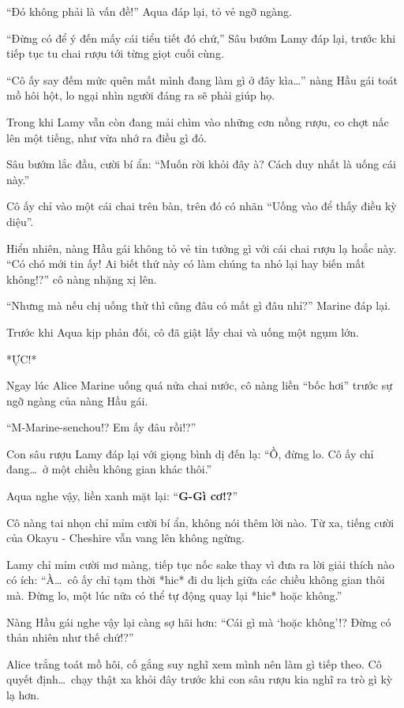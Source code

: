 \documentclass[../main.tex]{subfiles}
\begin{document}
``Đó không phải là vấn đề!'' Aqua đáp lại, tỏ vẻ ngỡ ngàng.

``Đừng có để ý đến mấy cái tiểu tiết đó chứ,'' Sâu bướm Lamy đáp lại, trước khi tiếp tục tu chai rượu tới từng giọt cuối cùng.

``Cô ấy say đếm mức quên mất mình đang làm gì ở đây kìa\dots'' nàng Hầu gái toát mồ hôi hột, lo ngại nhìn người đáng ra sẽ phải giúp họ.

Trong khi Lamy vẫn còn đang mải chìm vào những cơn nồng rượu, co chợt nấc lên một tiếng, như vừa nhớ ra điều gì đó.

Sâu bướm  lắc đầu, cười bí ẩn: ``Muốn rời khỏi đây à? Cách duy nhất là uống cái này.''

Cô ấy chỉ vào một cái chai trên bàn, trên đó có nhãn ``Uống vào để thấy điều kỳ diệu''.

Hiển nhiên, nàng Hầu gái không tỏ vẻ tin tưởng gì với cái chai rượu lạ hoắc này. ``Có chó mới tin ấy! Ai biết thứ này có làm chúng ta nhỏ lại hay biến mất không!?'' cô nàng nhặng xị lên.

``Nhưng mà nếu chị uống thử thì cũng đâu có mất gì đâu nhỉ?'' Marine đáp lại.

Trước khi Aqua kịp phản đối, cô đã giật lấy chai và uống một ngụm lớn.

*ỰC!*

Ngay lúc Alice Marine uống quá nửa chai nước, cô nàng liền ``bốc hơi'' trước sự ngỡ ngàng của nàng Hầu gái.

``M-Marine-senchou!? Em ấy đâu rồi!?''

Con sâu rượu Lamy đáp lại với giọng bình dị đến lạ: ``Ồ, đừng lo. Cô ấy chỉ đang\dots\ ở một chiều không gian khác thôi.''

Aqua nghe vậy, liền xanh mặt lại: ``\textbf{G-Gì cơ!?}''

Cô nàng tai nhọn chỉ mỉm cười bí ẩn, không nói thêm lời nào. Từ xa, tiếng cười của Okayu - Cheshire vẫn vang lên không ngừng.

Lamy chỉ mỉm cười mơ màng, tiếp tục nốc sake thay vì đưa ra lời giải thích nào có ích: ``À\dots\ cô ấy chỉ tạm thời *hic* đi du lịch giữa các chiều không gian thôi mà. Đừng lo, một lúc nữa có thể tự động quay lại *hic* hoặc không.''

Nàng Hầu gái nghe vậy lại càng sợ hãi hơn: ``Cái gì mà `hoặc không'!? Đừng có thản nhiên như thế chứ!?''

Alice trắng toát mồ hôi, cố gắng suy nghĩ xem mình nên làm gì tiếp theo. Cô quyết định\dots\ chạy thật xa khỏi đây trước khi con sâu rượu kia nghĩ ra trò gì kỳ lạ hơn.
\end{document}
